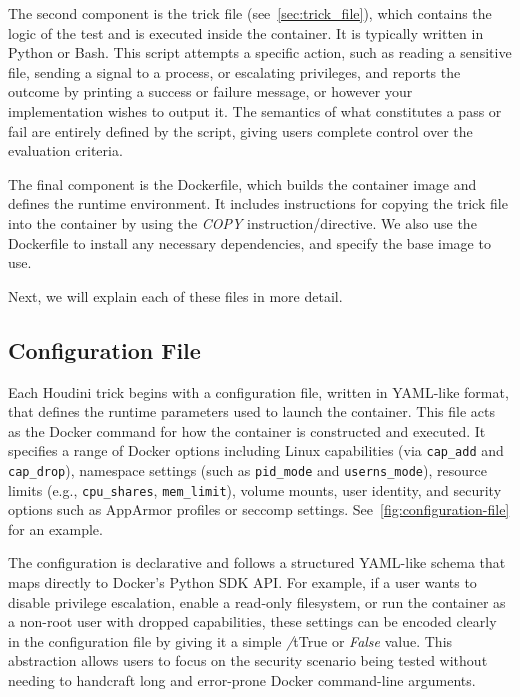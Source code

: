 \documentclass[12pt]{report}
\begin{document}
\begin{doublespace}
The second component is the trick file (see~\ref{sec:trick_file}), which contains the logic of the test and is executed inside the container. It is typically written in Python or Bash. This script attempts a specific action, such as reading a sensitive file, sending a signal to a process, or escalating privileges, and reports the outcome by printing a success or failure message, or however your implementation wishes to output it. The semantics of what constitutes a pass or fail are entirely defined by the script, giving users complete control over the evaluation criteria.

The final component is the Dockerfile, which builds the container image and defines the runtime environment. It includes instructions for copying the trick file into the container by using the \textit{COPY} instruction/directive. We also use the Dockerfile to install any necessary dependencies, and specify the base image to use.

Next, we will explain each of these files in more detail.

\subsection{Configuration File}
\label{sec:configuration}

Each Houdini trick begins with a configuration file, written in YAML-like format, that defines the runtime parameters used to launch the container. This file acts as the Docker command for how the container is constructed and executed. It specifies a range of Docker options including Linux capabilities (via \texttt{cap\_add} and \texttt{cap\_drop}), namespace settings (such as \texttt{pid\_mode} and \texttt{userns\_mode}), resource limits (e.g., \texttt{cpu\_shares}, \texttt{mem\_limit}), volume mounts, user identity, and security options such as AppArmor profiles or seccomp settings. See~\ref{fig:configuration-file} for an example.

The configuration is declarative and follows a structured YAML-like schema that maps directly to Docker's Python SDK API. For example, if a user wants to disable privilege escalation, enable a read-only filesystem, or run the container as a non-root user with dropped capabilities, these settings can be encoded clearly in the configuration file by giving it a simple \textit/t{True} or \textit{False} value. This abstraction allows users to focus on the security scenario being tested without needing to handcraft long and error-prone Docker command-line arguments.


\end{doublespace}
\end{document}
